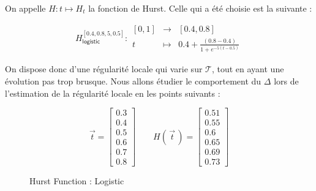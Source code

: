 \begin{minipage}{0.47\linewidth}
	On appelle $H : t \mapsto H_t$ la fonction de Hurst. Celle qui a été choisie est la suivante :

	$$
		H^{[0.4, 0.8, 5, 0.5]}_{\textsf{logistic}} : \begin{array}{ccc}
			[0,1] & \longrightarrow & [0.4, 0.8]
			\\
			t     & \longmapsto     & 0.4 + \frac{(0.8 - 0.4)}{1 + e^{-5(t - 0.5)}}
		\end{array}
	$$

	On dispose donc d'une régularité locale qui varie sur $\mathcal T$, tout en ayant une évolution pas trop brusque. Nous allons étudier le comportement du $\Delta$ lors de l'estimation de la régularité locale en les points suivants :

	$$
		\vec t = \begin{bmatrix} 0.3 \\ 0.4 \\ 0.5 \\ 0.6 \\ 0.7 \\ 0.8 \end{bmatrix}
		\quad\quad
		H(\, \vec t \,) =
		\begin{bmatrix}
			0.51 \\ 0.55 \\ 0.6 \\ 0.65 \\ 0.69 \\ 0.73
		\end{bmatrix}
	$$

\end{minipage}
\hfill
\begin{minipage}{0.47\linewidth}
	\begin{figure}[H]
		\centering
		\caption{Hurst Function : Logistic}
		\label{plot:hurst-logistic}
	\end{figure}
\end{minipage}


